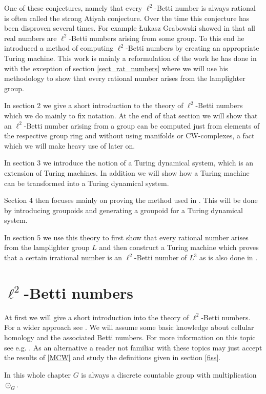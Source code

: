 \documentclass[12pt,a4paper]{scrartcl}
\theoremstyle{plain}
\theoremstyle{definition}
\newcommand{\2}{\mathbb{Z} / 2 \mathbb{Z}}
\newcommand{\1}{\bar{1}}
\newcommand{\0}{\bar{0}}
\begin{document}
One of these conjectures, namely that every $\ell^2$-Betti number is always rational is often called the strong Atiyah conjecture. Over the time this conjecture has been disproven several times. For example \L ukasz Grabowski showed in \cite{GRAB} that all real numbers are $\ell^2$-Betti numbers arising from some group. To this end he introduced a method of computing $\ell^2$-Betti numbers by creating an appropriate Turing machine. This work is mainly a reformulation of the work he has done in \cite{GRAB} with the exception of section \ref{sect_rat_numbers} where we will use his methodology to show that every rational number arises from the lamplighter group.

In section 2 we give a short introduction to the theory of $\ell^2$-Betti numbers which we do mainly to fix notation. At the end of that section we will show that an $\ell^2$-Betti number arising from a group can be computed just from elements of the respective group ring and without using manifolds or CW-complexes, a fact which we will make heavy use of later on.

In section 3 we introduce the notion of a Turing dynamical system, which is an extension of Turing machines. In addition we will show how a Turing machine can be transformed into a Turing dynamical system.

Section 4 then focuses mainly on proving the method used in \cite{GRAB}. This will be done by introducing groupoids and generating a groupoid for a Turing dynamical system.
 
In section 5 we use this theory to first show that every rational number arises from the lamplighter group $L$ and then construct a Turing machine which proves that a certain irrational number is an $\ell^2$-Betti number of $L^3$ as is also done in \cite{GRAB}. 
\newpage

\section{$\ell^2$-Betti numbers}
At first we will give a short introduction into the theory of $\ell^2$-Betti numbers. For a wider approach see \cite{LUECK}. We will assume some basic knowledge about cellular homology and the associated Betti numbers. For more information on this topic see e.g. \cite{HATCH}. As an alternative a reader not familiar with these topics may just accept the results of \ref{MCW} and study the definitions given in section \ref{fiss}.

In this whole chapter $G$ is always a discrete countable group with multiplication $\odot_G$.
\end{document}
